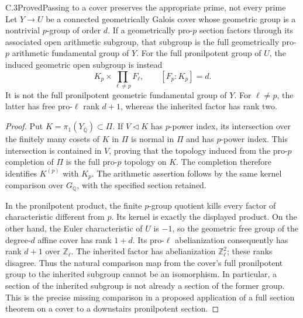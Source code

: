 \begin{result}{C.3}{Proved}{Passing to a cover preserves the appropriate prime, not every prime}
Let \(Y\to U\) be a connected geometrically Galois cover whose
geometric group is a nontrivial \(p\)-group of order \(d\).
If a geometrically pro-\(p\) section factors through its associated
open arithmetic subgroup, that subgroup is the full geometrically
pro-\(p\) arithmetic fundamental group of \(Y\).
For the full pronilpotent group of \(U\), the induced geometric open
subgroup is instead
\[
 K_p\times\prod_{\ell\ne p}F_\ell,
 \qquad [F_p:K_p]=d.
\]
It is not the full pronilpotent geometric fundamental group of \(Y\).
For \(\ell\ne p\), the latter has free pro-\(\ell\) rank \(d+1\),
whereas the inherited factor has rank two.
\end{result}
\begin{proof}
Put \(K=\pi_1(Y_{\overline{\mathbb Q}})\subset\Pi\).
If \(V\triangleleft K\) has \(p\)-power index, its intersection
over the finitely many cosets of \(K\) in \(\Pi\) is normal in
\(\Pi\) and has \(p\)-power index. This intersection is contained
in \(V\), proving that the topology induced from the pro-\(p\)
completion of \(\Pi\) is the full pro-\(p\) topology on \(K\).
The completion therefore identifies \(K^{(p)}\) with \(K_p\).
The arithmetic assertion follows by the same kernel comparison over
\(G_{\mathbb Q}\), with the specified section retained.

In the pronilpotent product, the finite \(p\)-group quotient kills
every factor of characteristic different from \(p\). Its kernel is
exactly the displayed product. On the other hand, the Euler
characteristic of \(U\) is \(-1\), so the geometric free group of
the degree-\(d\) affine cover has rank \(1+d\).
Its pro-\(\ell\) abelianization consequently has rank \(d+1\) over
\(\mathbb Z_\ell\). The inherited factor has abelianization
\(\mathbb Z_\ell^2\); these ranks disagree. Thus the natural
comparison map from the cover's full pronilpotent group to the inherited
subgroup cannot be an isomorphism. In particular, a section of the
inherited subgroup is not already a section of the former group.
This is the precise missing comparison in a proposed application of
a full section theorem on a cover to a downstairs pronilpotent section.
\end{proof}

